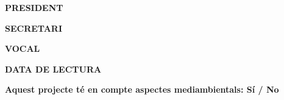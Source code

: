 \begin{titlepage}
\begin{center}
{\begin{tcolorbox}
                \begin{minipage}[t]{0.33\textwidth}
                    \centering\textbf{PRESIDENT}
                \end{minipage}
                \begin{minipage}[t]{0.33\textwidth}
                    \centering\textbf{SECRETARI}
                \end{minipage}%
                \begin{minipage}[t]{0.33\textwidth}
                    \centering\textbf{VOCAL}
                \end{minipage}%

                \vspace{2cm}
                \centering
                \textbf{DATA DE LECTURA}
                \vspace{1.25cm}
            \end{tcolorbox}
        }

        \vspace{0.75cm}
        \textbf{Aquest projecte té en compte aspectes mediambientals: Sí / No}

    \end{center}
\end{titlepage}
